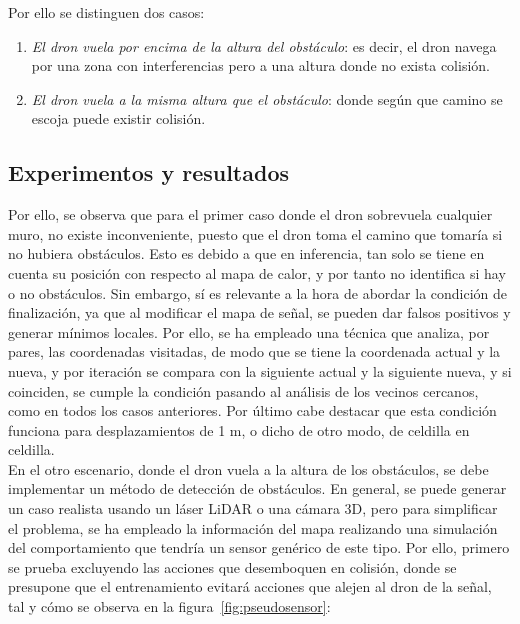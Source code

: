 Por ello se distinguen dos casos:

\begin{enumerate}
    \item \emph{El dron vuela por encima de la altura del obstáculo}: es decir, el dron navega por una zona con interferencias pero a una altura donde no exista colisión.

    \item \emph{El dron vuela a la misma altura que el obstáculo}: donde según que camino se escoja puede existir colisión.
\end{enumerate}

\subsection{Experimentos y resultados}
\label{subsec:experimentos_sfo}

Por ello, se observa que para el primer caso donde el dron sobrevuela cualquier muro, no existe inconveniente, puesto que el dron toma el camino que tomaría si no hubiera obstáculos. Esto es debido a que en inferencia, tan solo se tiene en cuenta su posición con respecto al mapa de calor, y por tanto no identifica si hay o no obstáculos. Sin embargo, sí es relevante a la hora de abordar la condición de finalización, ya que al modificar el mapa de señal, se pueden dar falsos positivos y generar mínimos locales. Por ello, se ha empleado una técnica que analiza, por pares, las coordenadas visitadas, de modo que se tiene la coordenada actual y la nueva, y por iteración se compara con la siguiente actual y la siguiente nueva, y si coinciden, se cumple la condición pasando al análisis de los vecinos cercanos, como en todos los casos anteriores. Por último cabe destacar que esta condición funciona para desplazamientos de 1 m, o dicho de otro modo, de celdilla en celdilla.\\

En el otro escenario, donde el dron vuela a la altura de los obstáculos, se debe implementar un método de detección de obstáculos. En general, se puede generar un caso realista usando un láser LiDAR o una cámara 3D, pero para simplificar el problema, se ha empleado la información del mapa realizando una simulación del comportamiento que tendría un sensor genérico de este tipo. Por ello, primero se prueba excluyendo las acciones que desemboquen en colisión, donde se presupone que el entrenamiento evitará acciones que alejen al dron de la señal, tal y cómo se observa en la figura~\ref{fig:pseudosensor}:

